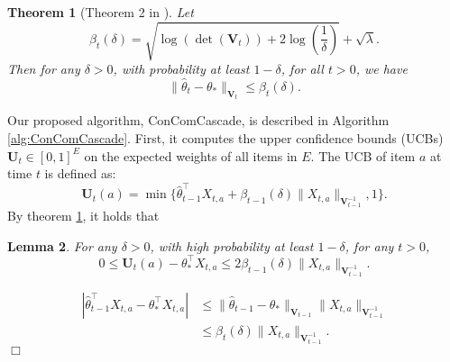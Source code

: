 \documentclass{article}
\newcommand{\bU}{\mathbf{U}}
\newcommand{\bV}{\mathbf{V}}
\newcommand{\abs}[1]{\left| #1 \right|}
\newcommand{\norm}[1]{\| #1 \|}
\newtheorem{theorem}{Theorem}[section]
\newtheorem{lemma}[theorem]{Lemma}%
\newenvironment{proof}{\noindent {\textbf{Proof. }}}{$\Box$ \medskip}
\begin{document}
	
\begin{theorem}[Theorem 2 in \cite{abbasi2011improved}]
\label{thm:theta_estimate}
Let 
$$
\beta_{t}(\delta) = \sqrt{\log(\det(\bV_{t})) + 2 \log(\frac{1}{\delta})} + \sqrt{\lambda}.
$$
Then for any $\delta > 0$, with probability at least $1 - \delta$, for all $t > 0$, we have
\begin{equation}
\norm{\hat{\theta}_t - \theta_*}_{\bV_{t}} \leq \beta_{t}(\delta).
\end{equation}
\end{theorem}
	
Our proposed algorithm, ConComCascade, is described in Algorithm \ref{alg:ConComCascade}. First, it computes the upper confidence bounds (UCBs) $\bU_t \in [0,1]^{E}$ on the expected weights of all items in $E$. The UCB of item $a$ at time $t$ is defined as:
\begin{equation}
\bU_t(a) = \min\{\hat{\theta}_{t-1}^{\top}X_{t,a} + \beta_{t-1}(\delta)\norm{X_{t,a}}_{\bV_{t-1}^{-1}}, 1\}.
\end{equation}
By theorem \ref{thm:theta_estimate}, it holds that
\begin{lemma}
\label{lem:estimateU}
For any $\delta > 0$, with high probability at least $1 - \delta$, for any $t>0$,
$$
0 \leq \bU_t(a) - \theta_*^{\top}X_{t,a} \leq 2\beta_{t-1}(\delta)\norm{X_{t,a}}_{\bV_{t-1}^{-1}}.
$$
\end{lemma}
\begin{proof}
\begin{align*}
\abs{\hat{\theta}_{t-1}^{\top}X_{t,a} - \theta_*^{\top}X_{t,a}} &\leq \norm{\hat{\theta}_{t-1} - \theta_*}_{\bV_{t-1}} \norm{X_{t,a}}_{\bV_{t-1}^{-1}} \\
&\leq \beta_{t}(\delta)\norm{X_{t,a}}_{\bV_{t-1}^{-1}}.
\end{align*}
\end{proof}
	
\end{document}
